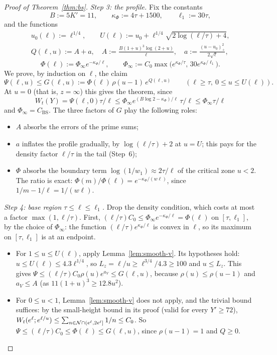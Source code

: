 \begin{proof}[Proof of Theorem~\ref{thm:bs}]
\emph{Step 3: the profile.} Fix the constants
\[
  B:=5K'=11,\qquad\kappa_\Phi:=4\tau+1500,\qquad\ell_1:=30\tau,
\]
and the functions
\begin{gather*}
  u_0(\ell):=\ell^{1/4},\qquad U(\ell):=u_0+\ell^{1/4}\sqrt{2\log(\ell/\tau)+4},\\
  Q(\ell,u):=A+a,\quad A:=\frac{B(1+u)^3\log(2+u)}{\ell},\quad a:=\frac{(u-u_0)_+^2}{2\sqrt\ell},
\end{gather*}
\[
  \Phi(\ell):=\Phi_\infty e^{-\kappa_\Phi/\ell},\qquad\Phi_\infty:=C_0\max\big(e^{\kappa_\Phi/\tau},\,30e^{\kappa_\Phi/\ell_1}\big).
\]
We prove, by induction on $\ell$, the claim
\begin{equation}\label{eq:bs-claim}
  \Psi(\ell,u)\le G(\ell,u):=\Phi(\ell)\,\rho(u-1)\,e^{Q(\ell,u)}\qquad(\ell\ge\tau,\ 0\le u\le U(\ell)).
\end{equation}
At $u=0$ (that is, $z=\infty$) this gives the theorem, since
\[
  W_t(Y)=\Psi(\ell,0)\tau/\ell\le\Phi_\infty e^{(B\log2-\kappa_\Phi)/\ell}\,\tau/\ell\le\Phi_\infty\tau/\ell
\]
and $\Phi_\infty=C_{\mathrm{BS}}$. The three factors of $G$ play the following roles:
\begin{itemize}
\item $A$ absorbs the errors of the prime sums;
\item $a$ inflates the profile gradually, by $\log(\ell/\tau)+2$ at $u=U$; this pays for the density factor $\ell/\tau$ in
  the tail (Step~6);
\item $\Phi$ absorbs the boundary term $\log(1/w_1)\approx2\tau/\ell$ of the critical zone $u<2$. The ratio is exact:
  $\Phi(m)/\Phi(\ell)=e^{-\kappa_\Phi/(w\ell)}$, since $1/m-1/\ell=1/(w\ell)$.
\end{itemize}

\emph{Step 4: base region $\tau\le\ell\le\ell_1$.} Drop the density condition, which costs at most a factor
$\max(1,\ell/\tau)$. First, $(\ell/\tau)C_0\le\Phi_\infty e^{-\kappa_\Phi/\ell}=\Phi(\ell)$ on $[\tau,\ell_1]$, by the choice of
$\Phi_\infty$: the function $(\ell/\tau)e^{\kappa_\Phi/\ell}$ is convex in $\ell$, so its maximum on $[\tau,\ell_1]$ is at an
endpoint.
\begin{itemize}
\item For $1\le u\le U(\ell)$, apply Lemma~\ref{lem:smooth-v}. Its hypotheses hold: $u\le U(\ell)\le4.3\ell^{1/4}$, so
  $L_z=\ell/u\ge\ell^{3/4}/4.3\ge100$ and $u\le L_z$. This gives $\Psi\le(\ell/\tau)C_0\rho(u)e^{a_V}\le G(\ell,u)$, because
  $\rho(u)\le\rho(u-1)$ and $a_V\le A$ (as $11(1+u)^3\ge12.8u^2$).
\item For $0\le u<1$, Lemma~\ref{lem:smooth-v} does not apply, and the trivial bound suffices: by the small-height bound in
  its proof (valid for every $Y'\ge72$), $W_t(e^\ell;e^{\ell/u})\le\sum_{n\in\mathcal{N}\cap(e^\ell,2e^\ell]}1/n\le C_0$. So
  $\Psi\le(\ell/\tau)C_0\le\Phi(\ell)\le G(\ell,u)$, since $\rho(u-1)=1$ and $Q\ge0$.
\end{itemize}


\end{proof}
